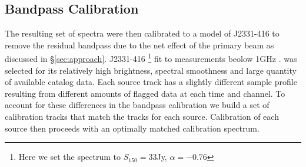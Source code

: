 \documentclass[preprint]{aastex}
\begin{document}
\subsection{Bandpass Calibration}
\label{sec:Calibration}

The resulting set of spectra were then calibrated to a model of J2331-416 to remove 
the residual bandpass due to the net effect of the primary beam as discussed in \S \ref{sec:approach}. J2331-416 
\footnote{Here we set the spectrum to $S_{150}=33$Jy, $\alpha=-0.76$} fit to measurements beolow 1GHz \citep{slee1995,kuhr_et_al1981,large_et_al1981,burgess_hunstead2006}.
was selected for its relatively high brightness, spectral smoothness and large quantity
 of available catalog data. Each source track has a slightly different sample profile
 resulting from different amounts of flagged data at each time and channel. To account
 for these differences in the bandpass calibration we build a set of calibration tracks 
 that match the tracks for each source. Calibration of each source then proceeds with
 an optimally matched calibration spectrum.



\end{document}
